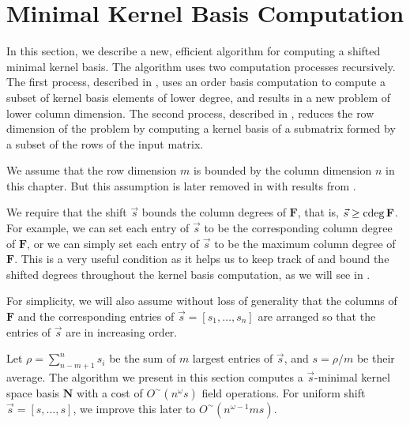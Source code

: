 
\section{Minimal Kernel Basis Computation}

\label{sec:Nullspace-Basis-Computation}

In this section, we describe a new, efficient algorithm for computing
a shifted minimal kernel basis. The algorithm uses two computation
processes recursively. The first process, described in ,
uses an order basis computation to compute a subset of kernel basis
elements of lower degree, and results in a new problem of lower column
dimension. The second process, described in ,
reduces the row dimension of the problem by computing a kernel basis
of a submatrix formed by a subset of the rows of the input matrix.

We assume that the row dimension $m$ is bounded by the column dimension
$n$ in this chapter. But this assumption is later removed in 
with results from .

We require that the shift $\vec{s}$ bounds the column degrees of
$\mathbf{F}$, that is, $\vec{s}\ge\cdeg\mathbf{F}$. For example,
we can set each entry of $\vec{s}$ to be the corresponding column
degree of $\mathbf{F}$, or we can simply set each entry of $\vec{s}$
to be the maximum column degree of $\mathbf{F}$. %
 This is a very useful condition as it helps us to keep track of and
bound the shifted degrees throughout the kernel basis computation,
as we will see in . 

For simplicity, we will also assume without loss of generality that
the columns of $\mathbf{F}$ and the corresponding entries of $\vec{s}=\left[s_{1},\dots,s_{n}\right]$
are arranged so that the entries of $\vec{s}$ are in increasing order.

Let $\rho=\sum_{n-m+1}^{n}s_{i}$ be the sum of $m$ largest entries
of $\vec{s}$, and $s=\rho/m$ be their average. The algorithm we
present in this section computes a $\vec{s}$-minimal kernel space
basis $\mathbf{N}$ with a cost of $O^{\sim}(n^{\omega}s)$ field
operations. For uniform shift $\vec{s}=\left[s,\dots,s\right]$, we
improve this later to $O^{\sim}\left(n^{\omega-1}ms\right)$.


